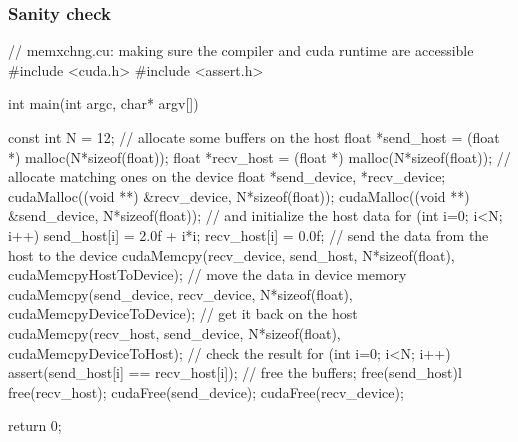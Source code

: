 \begin{frame}[fragile]
%
  \frametitle{Sanity check}
  \label{slide:sanity-cuda}
%
  \begin{C}[basicstyle=\tt\bfseries\tiny]
// memxchng.cu: making sure the compiler and cuda runtime are accessible
#include <cuda.h>
#include <assert.h>

int main(int argc, char* argv[]) {
    const int N = 12;
    // allocate some buffers on the host
    float *send_host = (float *) malloc(N*sizeof(float));
    float *recv_host = (float *) malloc(N*sizeof(float));
    // allocate matching ones on the device
    float *send_device, *recv_device;
    cudaMalloc((void **) &recv_device, N*sizeof(float));
    cudaMalloc((void **) &send_device, N*sizeof(float));
    // and initialize the host data
    for (int i=0; i<N; i++) {
        send_host[i] = 2.0f + i*i;
        recv_host[i] = 0.0f;
    }
    // send the data from the host to the device
    cudaMemcpy(recv_device, send_host, N*sizeof(float), cudaMemcpyHostToDevice);
    // move the data in device memory
    cudaMemcpy(send_device, recv_device, N*sizeof(float), cudaMemcpyDeviceToDevice);
    // get it back on the host
    cudaMemcpy(recv_host, send_device, N*sizeof(float), cudaMemcpyDeviceToHost);
    // check the result
    for (int i=0; i<N; i++) {
      assert(send_host[i] == recv_host[i]);
    }
    // free the buffers;
    free(send_host)l free(recv_host);
    cudaFree(send_device); cudaFree(recv_device);

    return 0;
}
  \end{C}
%
\end{frame}

